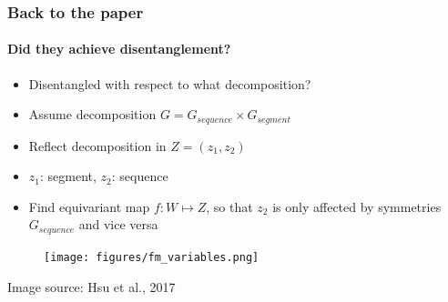 \documentclass[9pt]{beamer}
\begin{document}





\begin{frame}
\frametitle{Back to the paper}
\framesubtitle{Did they achieve disentanglement?}
\begin{itemize}
	\item Disentangled with respect to what decomposition?
	\item Assume decomposition $G = G_{sequence} \times G_{segment}$
	\item Reflect decomposition in $Z= (z_1, z_2)$
	\item $z_1$: segment, $z_2$: sequence
	\item Find equivariant map $f:W\mapsto Z$, so that $z_2$ is only affected by symmetries $G_{sequence}$ and vice versa%
\end{itemize}
\begin{figure}
	\texttt{[image: figures/fm\_variables.png]}
\end{figure}
\begin{tiny}
	Image source: Hsu et al., 2017 
\end{tiny}
\end{frame} 
\end{document}
